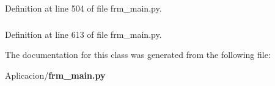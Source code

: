 \-Definition at line 504 of file frm\-\_\-main.\-py.

\subsubsection[{w}]{}\label{class_aplicacion_1_1frm__main_1_1_proc_tle_a76261cc03473963538670404ed4c693e}


\-Definition at line 613 of file frm\-\_\-main.\-py.



\-The documentation for this class was generated from the following file\-:\begin{DoxyCompactItemize}
\item 
\-Aplicacion/{\bf frm\-\_\-main.\-py}\end{DoxyCompactItemize}
